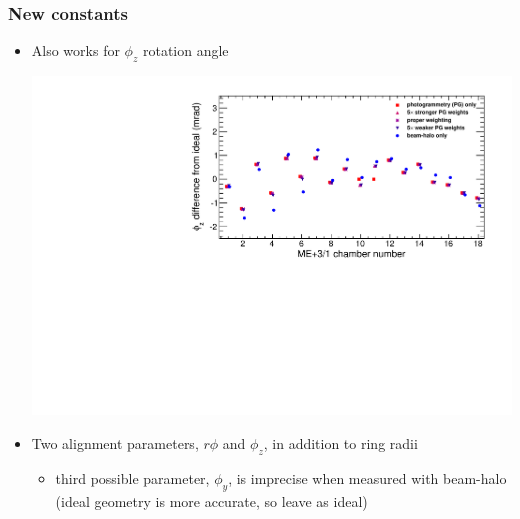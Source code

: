 \documentclass[compress]{beamer}
\begin{document}
\begin{frame}
\frametitle{New constants}

\begin{itemize}
\item Also works for $\phi_z$ rotation angle

\includegraphics[width=\linewidth]{dependence_on_weights_p31phiz.pdf}

\item Two alignment parameters, $r\phi$ and $\phi_z$, in addition to ring radii
\begin{itemize}
\item third possible parameter, $\phi_y$, is imprecise when measured
  with beam-halo (ideal geometry is more accurate, so leave as ideal)
\end{itemize}
\end{itemize}
\end{frame}
\end{document}
